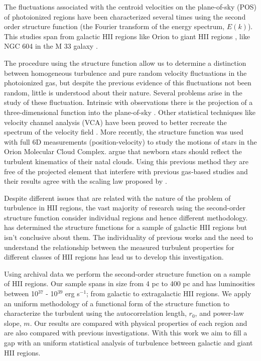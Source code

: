 \documentclass[fleqn,usenatbib, useAMS, a4paper]{mnras}
\begin{document}
The fluctuations associated with the centroid velocities on the plane-of-sky (POS) of photoionized regions have been characterized several times using the second order structure function (the Fourier transform of the energy spectrum, $E(k)$).
This studies span from galactic HII regions \citep{1986ApJ...300..624R} like Orion \citep{von1951methode,munch1958internal,castaneda1988,1992ApJ...387..229O,arthur2016turbulence} to giant HII regions \citep{1961MNRAS.122....1F,lagrois2009multi,lagrois2011}, like NGC 604 in the M 33 galaxy \citep{tanco1997,2019arXiv191203543M}.

The procedure using the structure function allow us to determine a distinction between homogeneous turbulence and pure random velocity fluctuations in the photoionized gas, but despite the previous evidence of this fluctuations not been random, little is understood about their nature.
Several problems arise in the study of these fluctuation.
Intrinsic with observations there is the projection of a three-dimensional function into the plane-of-sky \citep{von1951methode,munch1958internal}.
Other statistical techniques like velocity channel analysis (VCA) \citep{2000ApJ...537..720L} have been proved to better recreate the spectrum of the velocity field \citep{medina2014,arthur2016turbulence}.
More recently, the structure function was used with full 6D measurements (position-velocity) to study the motions of stars in the Orion Molecular Cloud Complex.
\citet{2021ApJ...907L..40H} argue that newborn stars should reflect the turbulent kinematics of their natal clouds.
Using this previous method they are free of the projected element that interfere with previous gas-based studies and their results agree with the scaling law proposed by \citet{1981MNRAS.194..809L}.

Despite different issues that are related with the nature of the problem of turbulence in HII regions, the vast majority of research using the second-order structure function consider individual regions and hence different methodology.
\citet{1987ApJ...317..686O} has determined the structure functions for a sample of galactic HII regions but isn't conclusive about them.
The individuality of previous works and the need to understand the relationship between the measured turbulent properties for different classes of HII regions has lead us to develop this investigation.

Using archival data we perform the second-order structure function on a sample of HII regions.
Our sample spans in size from 4 pc to 400 pc and has luminosities between 10\(^{37}\) - 10\(^{39}\) erg s\(^{-1}\); from galactic to extragalactic HII regions.
We apply an uniform methodology of a functional form of the structure function to characterize the turbulent using the  autocorrelation length, \(r_0\), and power-law slope, \(m\).
Our results are compared with physical properties of each region and are also compared with previous investigations.
With this work we aim to fill a gap with an uniform statistical analysis of turbulence between galactic and giant HII regions.
\end{document}
